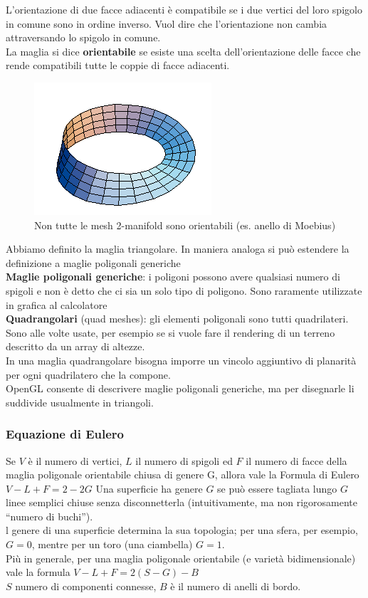 \documentclass[a4paper, 10pt]{article}
\begin{document}
		\noindent
		L’orientazione di due facce adiacenti è compatibile se i due
		vertici del loro spigolo in comune sono in ordine inverso. Vuol
		dire che l’orientazione non cambia attraversando lo spigolo in
		comune.\\
		La maglia si dice \textbf{orientabile} se esiste una scelta
		dell’orientazione delle facce che rende compatibili tutte le
		coppie di facce adiacenti.
		
			\begin{figure}[h!]
				\centering
				\includegraphics[scale=0.5]{moebius}
				\caption{Non tutte le mesh 2-manifold sono
					orientabili (es. anello di Moebius)} 
			\end{figure}
		
		Abbiamo definito la maglia triangolare. In maniera analoga si
		può estendere la definizione a maglie poligonali generiche\\
		\textbf{Maglie poligonali generiche}: i poligoni possono avere qualsiasi
		numero di spigoli e non è detto che ci sia un solo tipo di poligono.
		Sono raramente utilizzate in grafica al calcolatore\\
		\textbf{Quadrangolari} (quad meshes): gli elementi poligonali sono tutti
		quadrilateri. Sono alle volte usate, per esempio se si vuole fare il
		rendering di un terreno descritto da un array di altezze.\\ In una
		maglia quadrangolare bisogna imporre un vincolo aggiuntivo di
		planarità per ogni quadrilatero che la compone.\\
		OpenGL consente di descrivere maglie poligonali generiche, ma
		per disegnarle li suddivide usualmente in triangoli.
		
	\subsubsection{Equazione di Eulero}
		Se $ V $ è il numero di vertici, $ L $ il numero di spigoli ed $ F $ il numero di
		facce della maglia poligonale orientabile chiusa di genere G, allora
		vale la Formula di Eulero $ V - L + F = 2 - 2G $
		Una superficie ha genere $ G $ se può essere tagliata lungo $ G $
		linee semplici chiuse senza disconnetterla (intuitivamente,
		ma non rigorosamente “numero di buchi”).\\
		l genere di una superficie determina la sua
		topologia; per una sfera, per esempio, $ G = 0 $,
		mentre per un toro (una ciambella) $ G = 1 $.\\
		Più in generale, per una maglia poligonale orientabile (e varietà
		bidimensionale) vale la formula $ V - L + F = 2(S - G) - B $\\
		$ S $ numero di componenti connesse, $ B $ è il numero di anelli di bordo.
		
\end{document}
